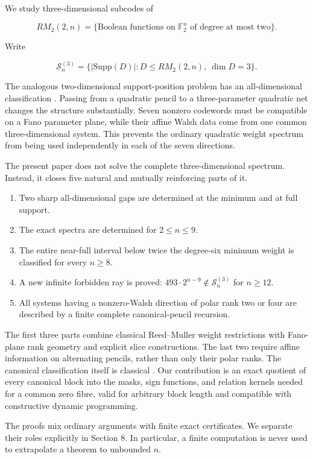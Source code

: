 \documentclass[11pt]{article}
\theoremstyle{remark}
\numberwithin{equation}{section}
\begin{document}
We study three-dimensional subcodes of

\[
RM_2(2,n)=\{\text{Boolean functions on }\mathbb F_2^n
\text{ of degree at most two}\}.
\]

Write

\[
\mathcal S_n^{(3)}=
\{|\mathrm{Supp}(D)|:D\le RM_2(2,n),\ \dim D=3\}.
\]

The analogous two-dimensional support-position problem has an all-dimensional
classification \cite{carptopus2026}. Passing from a quadratic pencil to a three-parameter
quadratic net changes the structure substantially. Seven nonzero codewords must
be compatible on a Fano parameter plane, while their affine Walsh data come
from one common three-dimensional system. This prevents the ordinary quadratic
weight spectrum from being used independently in each of the seven directions.

The present paper does not solve the complete three-dimensional spectrum.
Instead, it closes five natural and mutually reinforcing parts of it.

\begin{enumerate}
\item Two sharp all-dimensional gaps are determined at the minimum and at full
support.
\item The exact spectra are determined for \(2\le n\le9\).
\item The entire near-full interval below twice the degree-six minimum weight is
classified for every \(n\ge8\).
\item A new infinite forbidden ray is proved:
\(493\cdot2^{n-9}\notin\mathcal S_n^{(3)}\) for \(n\ge12\).
\item All systems having a nonzero-Walsh direction of polar rank two or four are
described by a finite complete canonical-pencil recursion.
\end{enumerate}


The first three parts combine classical Reed--Muller weight restrictions with
Fano-plane rank geometry and explicit slice constructions. The last two require
affine information on alternating pencils, rather than only their polar ranks.
The canonical classification itself is classical \cite{plut2015,macariorat2013}. Our contribution is an
exact quotient of every canonical block into the masks, sign functions, and
relation kernels needed for a common zero fibre, valid for arbitrary block
length and compatible with constructive dynamic programming.

The proofs mix ordinary arguments with finite exact certificates. We separate
their roles explicitly in Section 8. In particular, a finite computation is
never used to extrapolate a theorem to unbounded \(n\).
\end{document}
